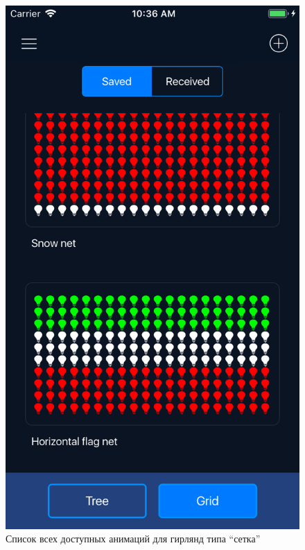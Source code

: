 ~
\begin{figure}[H]
\centering
	\includegraphics[scale=0.2]{figures/userGuide/mainGrid.png}
	\caption{Список всех доступных анимаций для гирлянд типа ``сетка''}
	\label{fig:develop:userGuide:mainGrid}
\end{figure}
~
